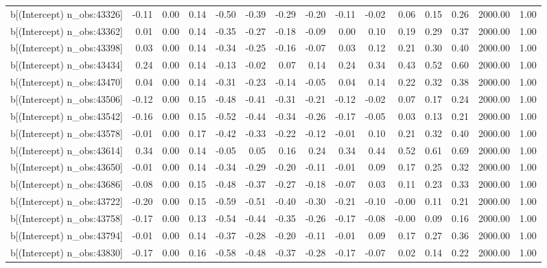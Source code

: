 \begin{table}[ht]
\begin{tabular}{rrrrrrrrrrrrrrr}
  b[(Intercept) n\_obs:43326] & -0.11 & 0.00 & 0.14 & -0.50 & -0.39 & -0.29 & -0.20 & -0.11 & -0.02 & 0.06 & 0.15 & 0.26 & 2000.00 & 1.00 \\ 
  b[(Intercept) n\_obs:43362] & 0.01 & 0.00 & 0.14 & -0.35 & -0.27 & -0.18 & -0.09 & 0.00 & 0.10 & 0.19 & 0.29 & 0.37 & 2000.00 & 1.00 \\ 
  b[(Intercept) n\_obs:43398] & 0.03 & 0.00 & 0.14 & -0.34 & -0.25 & -0.16 & -0.07 & 0.03 & 0.12 & 0.21 & 0.30 & 0.40 & 2000.00 & 1.00 \\ 
  b[(Intercept) n\_obs:43434] & 0.24 & 0.00 & 0.14 & -0.13 & -0.02 & 0.07 & 0.14 & 0.24 & 0.34 & 0.43 & 0.52 & 0.60 & 2000.00 & 1.00 \\ 
  b[(Intercept) n\_obs:43470] & 0.04 & 0.00 & 0.14 & -0.31 & -0.23 & -0.14 & -0.05 & 0.04 & 0.14 & 0.22 & 0.32 & 0.38 & 2000.00 & 1.00 \\ 
  b[(Intercept) n\_obs:43506] & -0.12 & 0.00 & 0.15 & -0.48 & -0.41 & -0.31 & -0.21 & -0.12 & -0.02 & 0.07 & 0.17 & 0.24 & 2000.00 & 1.00 \\ 
  b[(Intercept) n\_obs:43542] & -0.16 & 0.00 & 0.15 & -0.52 & -0.44 & -0.34 & -0.26 & -0.17 & -0.05 & 0.03 & 0.13 & 0.21 & 2000.00 & 1.00 \\ 
  b[(Intercept) n\_obs:43578] & -0.01 & 0.00 & 0.17 & -0.42 & -0.33 & -0.22 & -0.12 & -0.01 & 0.10 & 0.21 & 0.32 & 0.40 & 2000.00 & 1.00 \\ 
  b[(Intercept) n\_obs:43614] & 0.34 & 0.00 & 0.14 & -0.05 & 0.05 & 0.16 & 0.24 & 0.34 & 0.44 & 0.52 & 0.61 & 0.69 & 2000.00 & 1.00 \\ 
  b[(Intercept) n\_obs:43650] & -0.01 & 0.00 & 0.14 & -0.34 & -0.29 & -0.20 & -0.11 & -0.01 & 0.09 & 0.17 & 0.25 & 0.32 & 2000.00 & 1.00 \\ 
  b[(Intercept) n\_obs:43686] & -0.08 & 0.00 & 0.15 & -0.48 & -0.37 & -0.27 & -0.18 & -0.07 & 0.03 & 0.11 & 0.23 & 0.33 & 2000.00 & 1.00 \\ 
  b[(Intercept) n\_obs:43722] & -0.20 & 0.00 & 0.15 & -0.59 & -0.51 & -0.40 & -0.30 & -0.21 & -0.10 & -0.00 & 0.11 & 0.21 & 2000.00 & 1.00 \\ 
  b[(Intercept) n\_obs:43758] & -0.17 & 0.00 & 0.13 & -0.54 & -0.44 & -0.35 & -0.26 & -0.17 & -0.08 & -0.00 & 0.09 & 0.16 & 2000.00 & 1.00 \\ 
  b[(Intercept) n\_obs:43794] & -0.01 & 0.00 & 0.14 & -0.37 & -0.28 & -0.20 & -0.11 & -0.01 & 0.09 & 0.17 & 0.27 & 0.36 & 2000.00 & 1.00 \\ 
  b[(Intercept) n\_obs:43830] & -0.17 & 0.00 & 0.16 & -0.58 & -0.48 & -0.37 & -0.28 & -0.17 & -0.07 & 0.02 & 0.14 & 0.22 & 2000.00 & 1.00 \\ 

\end{tabular}
\end{table}
